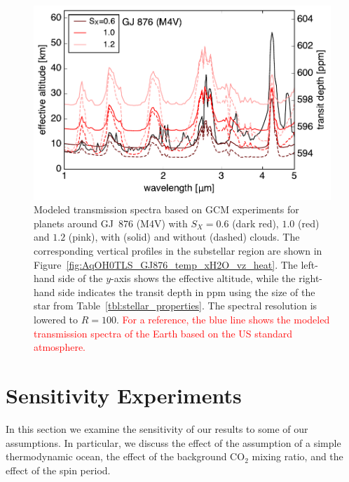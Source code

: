 \documentclass[11pt,numberedappendix,twocolappendix,]{emulateapj}
\def\addYF#1{\textcolor{red}{#1}}
\begin{document}
\begin{figure}[!h]
    \begin{center}
    \includegraphics[width=\hsize]{transit_GJ876_USstandard.pdf}
    \end{center}
\caption{Modeled transmission spectra based on GCM experiments for planets around GJ~876 (M4V) with $S_X=0.6$ (dark red), $1.0$ (red) and $1.2$ (pink), with (solid) and without (dashed) clouds. The corresponding vertical profiles in the substellar region are shown in Figure~\ref{fig:AqOH0TLS_GJ876_temp_xH2O_vz_heat}. The left-hand side of the $y$-axis shows the effective altitude, while the right-hand side indicates the transit depth in ppm using the size of the star from Table~\ref{tbl:stellar_properties}. The spectral resolution is lowered to $R=100$. 
\addYF{For a reference, the blue line shows the modeled transmission spectra of the Earth based on the US standard atmosphere. }}
\label{fig:transmission}
\end{figure}


\section{Sensitivity Experiments }
\label{s:sensitivity}

In this section we examine the sensitivity of our results to some of our assumptions. 
In particular, we discuss the effect of the assumption of a simple thermodynamic ocean, the effect of the background CO$_2$ mixing ratio, and the effect of the spin period. 
\end{document}
